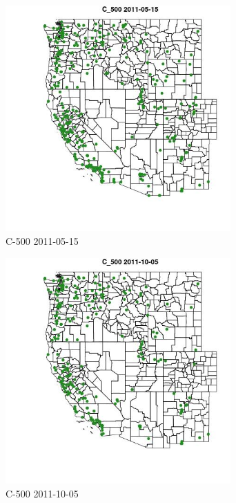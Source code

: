 \begin{figure} 
\centering  
\includegraphics[width=0.77\textwidth]{Code_Outputs/ML_input_report_ML_input_PM25_Step5_part_d_de_duplicated_aves_ML_input_MapObsC_5002011-05-15.jpg} 
\caption{\label{fig:ML_input_report_ML_input_PM25_Step5_part_d_de_duplicated_aves_ML_inputMapObsC_5002011-05-15}C-500 2011-05-15} 
\end{figure} 
 

\begin{figure} 
\centering  
\includegraphics[width=0.77\textwidth]{Code_Outputs/ML_input_report_ML_input_PM25_Step5_part_d_de_duplicated_aves_ML_input_MapObsC_5002011-10-05.jpg} 
\caption{\label{fig:ML_input_report_ML_input_PM25_Step5_part_d_de_duplicated_aves_ML_inputMapObsC_5002011-10-05}C-500 2011-10-05} 
\end{figure} 
 

